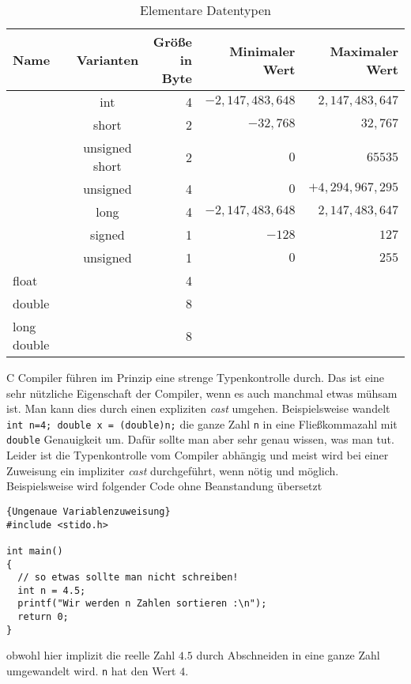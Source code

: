 \begin{table}[t]
\caption{Elementare Datentypen\label{tabelle1}}  %
\centering
\begin{tabular}{|l c c rrr|}
\hline
Name & & Varianten & Größe in Byte & Minimaler Wert & Maximaler Wert
\\[0.5ex]   
\hline %
                       & & int &4 & $-2,147,483,648$ & $2,147,483,647$ \\[-0.0ex]
                       & & short & 2 & $-32,768$ & $32,767$ \\[-0.0ex]
\raisebox{1ex}{int}  & & unsigned short& 2 & $0$ & $65535$ \\[-0.0ex]
                       & &unsigned& 4 & $0$ & $ +4,294,967,295$ \\[1ex]
                       & &long& 4 &  $-2,147,483,648$ & $2,147,483,647$ \\
\hline
                            & &signed & 1 & $-128$ & $127$ \\[-1ex]
\raisebox{1.5ex}{char} &    & unsigned &1 & $0$ & $255$  \\[1ex]
\hline
float & & & 4 &  &  \\
double& & & 8 &  &  \\
long double& & &8 &  &  \\[1ex]

\hline                          %
\end{tabular}
\label{tab:PPer}
\end{table}

C Compiler führen im Prinzip eine strenge Typenkontrolle durch.
Das ist eine sehr nützliche Eigenschaft der Compiler, wenn es auch manchmal etwas mühsam ist. 
Man kann dies durch einen expliziten \emph{cast} umgehen.
Beispielsweise wandelt \texttt{int n=4; double x = (double)n;} die ganze Zahl \texttt{n} in eine Fließkommazahl mit \texttt{double} Genauigkeit um.
Dafür sollte man aber sehr genau wissen, was man tut.
Leider ist die Typenkontrolle vom Compiler abhängig und meist wird bei einer Zuweisung ein impliziter \emph{cast} durchgeführt, wenn nötig und möglich.
Beispielsweise wird folgender Code ohne Beanstandung übersetzt
\begin{lstlisting}{Ungenaue Variablenzuweisung}
#include <stido.h>

int main()
{
  // so etwas sollte man nicht schreiben!
  int n = 4.5;
  printf("Wir werden n Zahlen sortieren :\n");
  return 0;
}
\end{lstlisting}
obwohl hier implizit die reelle Zahl $4.5$ durch Abschneiden in eine ganze Zahl umgewandelt wird.
\texttt{n} hat den Wert $4$.

